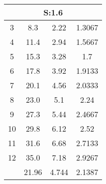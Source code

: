 
\begin{table}[H]
\begin{tabular}{c|ccc}
\multicolumn{4}{c}{S:1.6}\\\hline
3 & 8.3 & 2.22 & 1.3067\\
4 & 11.4 & 2.94 & 1.5667\\
5 & 15.3 & 3.28 & 1.7\\
6 & 17.8 & 3.92 & 1.9133\\
7 & 20.1 & 4.56 & 2.0333\\
8 & 23.0 & 5.1 & 2.24\\
9 & 27.3 & 5.44 & 2.4667\\
10 & 29.8 & 6.12 & 2.52\\
11 & 31.6 & 6.68 & 2.7133\\
12 & 35.0 & 7.18 & 2.9267\\
\hline
& 21.96 & 4.744 & 2.1387\\
\end{tabular}
\end{table}